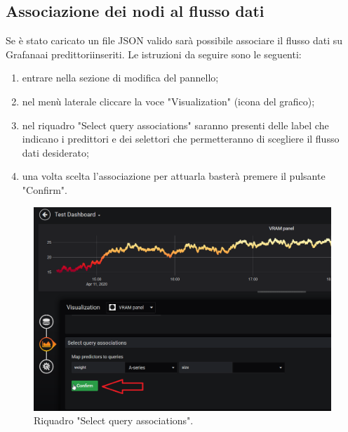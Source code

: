     \subsection{Associazione dei nodi al flusso dati}
        Se è stato caricato un file JSON valido sarà possibile associare il flusso dati su Grafana\glosp ai predittori\glosp inseriti. Le istruzioni da seguire sono le seguenti:
        \begin{enumerate}
            \item entrare nella sezione di modifica del pannello;
            \item nel menù laterale cliccare la voce "Visualization" (icona del grafico);
            \item nel riquadro "Select query associations" saranno presenti delle label che indicano i predittori e dei selettori che permetteranno di scegliere il flusso dati desiderato;
            \item una volta scelta l'associazione per attuarla basterà premere il pulsante "Confirm".
        \end{enumerate}
        \begin{figure}[H]
            \includegraphics[width=\textwidth,height=\textheight,keepaspectratio]{img/associazione_nodi.png}
            \caption{Riquadro "Select query associations".}
        \end{figure}
